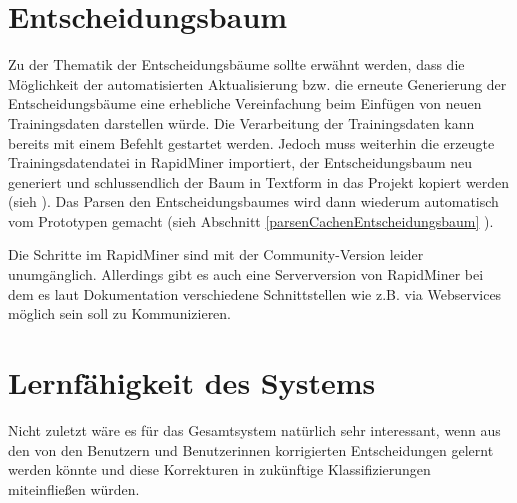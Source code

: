 \section{Entscheidungsbaum}
Zu der Thematik der Entscheidungsbäume sollte erwähnt werden, dass die Möglichkeit der automatisierten Aktualisierung bzw. die erneute Generierung der Entscheidungsbäume eine erhebliche Vereinfachung beim Einfügen von neuen Trainingsdaten darstellen würde. Die Verarbeitung der Trainingsdaten kann bereits mit einem Befehlt gestartet werden. Jedoch muss weiterhin die erzeugte Trainingsdatendatei in RapidMiner importiert, der Entscheidungsbaum neu generiert und schlussendlich der Baum in Textform in das Projekt kopiert werden (sieh ). Das Parsen den Entscheidungsbaumes wird dann wiederum automatisch vom Prototypen gemacht (sieh Abschnitt \ref{parsenCachenEntscheidungsbaum} ). 

Die Schritte im RapidMiner sind mit der Community-Version leider unumgänglich. Allerdings gibt es auch eine Serverversion von RapidMiner bei dem es laut Dokumentation verschiedene Schnittstellen wie z.B. via Webservices möglich sein soll zu Kommunizieren. 

\section{Lernfähigkeit des Systems}
Nicht zuletzt wäre es für das Gesamtsystem natürlich sehr interessant, wenn aus den von den Benutzern und Benutzerinnen korrigierten Entscheidungen gelernt werden könnte und diese Korrekturen in zukünftige Klassifizierungen miteinfließen würden. 
